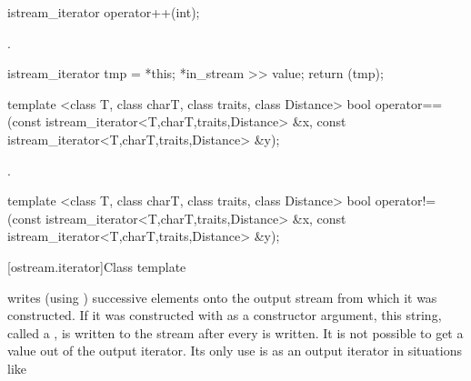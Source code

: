 %
%
\begin{itemdecl}
istream_iterator operator++(int);
\end{itemdecl}

\begin{itemdescr}
\pnum
\requires {}.

\pnum
\effects
\begin{codeblock}
istream_iterator tmp = *this;
*in_stream >> value;
return (tmp);
\end{codeblock}
\end{itemdescr}

%
%
\begin{itemdecl}
template <class T, class charT, class traits, class Distance>
  bool operator==(const istream_iterator<T,charT,traits,Distance> &x,
                  const istream_iterator<T,charT,traits,Distance> &y);
\end{itemdecl}

\begin{itemdescr}
\pnum
\returns
{}.%
\end{itemdescr}

%
%
\begin{itemdecl}
template <class T, class charT, class traits, class Distance>
  bool operator!=(const istream_iterator<T,charT,traits,Distance> &x,
                  const istream_iterator<T,charT,traits,Distance> &y);
\end{itemdecl}

%
\begin{itemdescr}
\pnum
\returns
{}
\end{itemdescr}

[ostream.iterator]{Class template }

\pnum
{}%
writes (using
)
successive elements onto the output stream from which it was constructed.
If it was constructed with
as a constructor argument, this string, called a
,
is written to the stream after every
is written.
It is not possible to get a value out of the output iterator.
Its only use is as an output iterator in situations like

